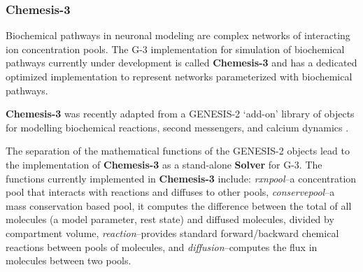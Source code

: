 \documentclass{article}
\begin{document}

\subsubsection{Chemesis-3}

Biochemical pathways in neuronal modeling are complex networks of
interacting ion concentration pools.  The G-3 implementation for
simulation of biochemical pathways currently under development is
called {\bf Chemesis-3} and has a dedicated optimized implementation
to represent networks parameterized with biochemical pathways.

{\bf Chemesis-3} was recently adapted from a GENESIS-2 `add-on'
library of objects for modelling biochemical reactions, second
messengers, and calcium dynamics
\cite{blackwell00:_eviden_distin_light_induc_calcium}.

The separation of the mathematical functions of the GENESIS-2 objects
lead to the implementation of {\bf Chemesis-3} as a stand-alone {\bf
  Solver} for G-3.  The functions currently implemented in
{\bf Chemesis-3} include: {\it rxnpool}--a concentration pool that
interacts with reactions and diffuses to other pools, {\it
  conservepool}--a mass conservation based pool, it computes the
difference between the total of all molecules (a model parameter, rest
state) and diffused molecules, divided by compartment volume, {\it
  reaction}--provides standard forward/backward chemical reactions
between pools of molecules, and {\it diffusion}--computes the flux in
molecules between two pools.




\end{document}
